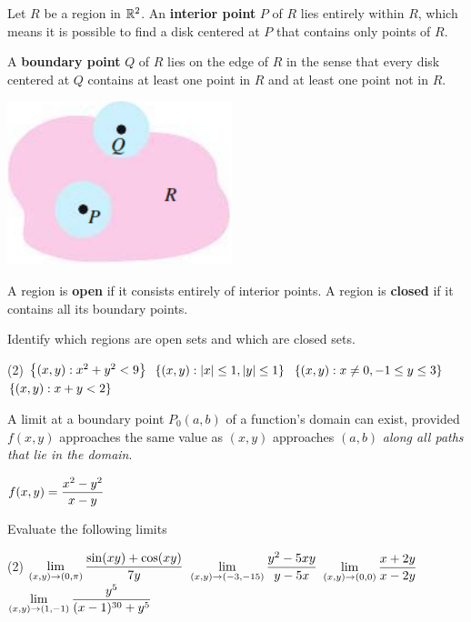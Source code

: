 \documentclass[../mathNotesPreamble]{subfiles}
\begin{document}
  \begin{defn*}
    Let $R$ be a region in $\mathbb{R}^2$. An \textbf{interior point} $P$ of $R$ lies entirely within $R$, which means it is possible to find a disk centered at $P$ that contains only points of $R$.
    \vspace*{\baselineskip}
    
    A \textbf{boundary point} $Q$ of $R$ lies on the edge of $R$ in the sense that every disk centered at $Q$ contains at least one point in $R$ and at least one point not in $R$.
  \end{defn*}
  \begin{center}
    \includegraphics[width=0.25\linewidth]{../images/briggs_15_02/fig15_22}
  \end{center}

  \begin{defn*}
    A region is \textbf{open} if it consists entirely of interior points. A region is \textbf{closed} if it contains all its boundary points.
  \end{defn*}
  \begin{ex*}
    Identify which regions are open sets and which are closed sets.
  \end{ex*}
  \begin{tasks}[after-item-skip=\stretch{1}, label=](2)
    \task ${\left\{(x,y): x^2+y^2 < 9\right\}}$
    \task ${\left\{(x,y): {\left\vert x\right\vert}\leq 1, {\left\vert y\right\vert}\leq 1\right\}}$
    \task ${\left\{(x,y): x\neq 0, -1\leq y\leq 3\right\}}$
    \task ${\left\{(x,y): x+y<2\right\}}$
  \end{tasks}
  \pagebreak

  A limit at a boundary point $P_0(a,b)$ of a function's domain can exist, provided $f(x,y)$ approaches the same value as $(x,y)$ approaches $(a,b)$ \textit{along all paths that lie in the domain}.
  \begin{ex*}
    $\displaystyle f(x,y)=\frac{x^2-y^2}{x-y}$
  \end{ex*}

  \begin{ex*}
    Evaluate the following limits
  \end{ex*}
  \begin{tasks}[after-item-skip=\stretch{1}, label=](2)
    \task $\displaystyle\lim_{(x,y)\to (0,\pi)} \frac{\sin(xy)+\cos(xy)}{7y}$
    \task $\displaystyle\lim_{(x,y)\to (-3,-15)} \frac{y^2-5xy}{y-5x}$
    \task $\displaystyle\lim_{(x,y)\to (0,0)} \frac{x+2y}{x-2y}$
    \task $\displaystyle\lim_{(x,y)\to (1,-1)} \frac{y^5}{(x-1)^{30}+y^5}$
  \end{tasks}
\end{document}
